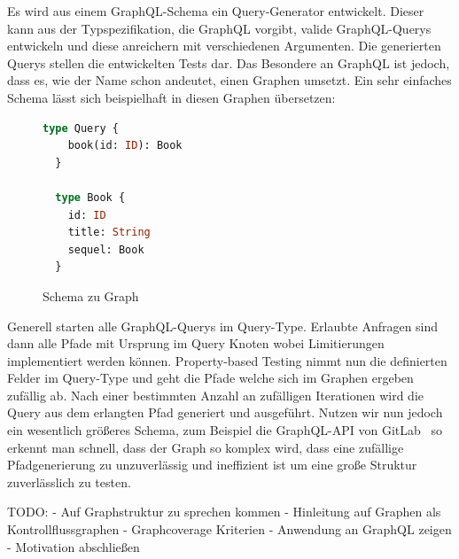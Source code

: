 Es wird aus einem GraphQL-Schema ein Query-Generator entwickelt.
Dieser kann aus der Typspezifikation, die GraphQL vorgibt, valide GraphQL-Querys entwickeln und diese anreichern mit verschiedenen Argumenten.
Die generierten Querys stellen die entwickelten Tests dar.
Das Besondere an GraphQL ist jedoch, dass es, wie der Name schon andeutet, einen Graphen umsetzt.
Ein sehr einfaches Schema lässt sich beispielhaft in diesen Graphen übersetzen:

\begin{figure}[h!]
    \centering
    \begin{minipage}{0.45\textwidth}
        \begin{lstlisting}[language=GraphQL]
  type Query {
    book(id: ID): Book
  }

  type Book {
    id: ID
    title: String
    sequel: Book
  }
        \end{lstlisting}
    \end{minipage}
    \hfill %
    \begin{minipage}{0.45\textwidth}
    \end{minipage}
    \caption{Schema zu Graph}
\end{figure}

Generell starten alle GraphQL-Querys im Query-Type.
Erlaubte Anfragen sind dann alle Pfade mit Ursprung im Query Knoten wobei Limitierungen implementiert werden können.
Property-based Testing nimmt nun die definierten Felder im Query-Type und geht die Pfade welche sich im Graphen ergeben zufällig ab.
Nach einer bestimmten Anzahl an zufälligen Iterationen wird die Query aus dem erlangten Pfad generiert und ausgeführt.
Nutzen wir nun jedoch ein wesentlich größeres Schema, zum Beispiel die GraphQL-API von GitLab~\cite{gitlab} so erkennt man schnell, dass
der Graph so komplex wird, dass eine zufällige Pfadgenerierung zu unzuverlässig und ineffizient ist um
eine große Struktur zuverlässlich zu testen.


TODO:
- Auf Graphstruktur zu sprechen kommen
- Hinleitung auf Graphen als Kontrollflussgraphen
- Graphcoverage Kriterien
- Anwendung an GraphQL zeigen
- Motivation abschließen









